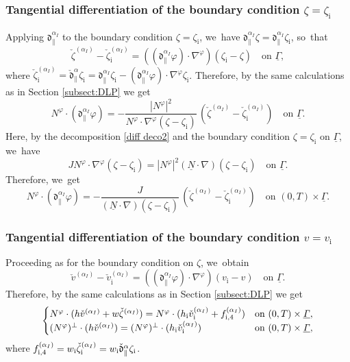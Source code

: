 \documentclass[JEP,XML,SOM,Unicode,NoFloatCountersInSection,published]{cedram}
\newcommand{\dpar}{{\mathfrak d}_{\parallel}}
\newcommand{\ul}[1]{\underline{#1}}
\newcommand{\itGamma}{\mathit{\Gamma}}
\newcommand{\cmfalpha}{\check{\mathfrak{d}}^{\alpha}}
\theoremstyle{definition}
\begin{document}
\subsubsection{Tangential differentiation of the boundary condition $\zeta=\zeta_\mathrm{i}$}
Applying $\dpar^{\alpha_I}$ to the boundary condition $\zeta=\zeta_\mathrm{i}$, we~have $\dpar^{\alpha_I}\zeta=\dpar^{\alpha_I}\zeta_\mathrm{i}$, so~that
\[
\check{\zeta}^{(\alpha_I)}-\check{\zeta}_\mathrm{i}^{(\alpha_I)} = ((\dpar^{\alpha_I}\varphi)\cdot\nabla^\varphi)(\zeta_\mathrm{i}-\zeta)
\quad\mbox{on } \ul{\itGamma},
\]
where $\check{\zeta}_\mathrm{i}^{(\alpha_I)} = \cmfalpha_\parallel \zeta_\mathrm{i}
= \dpar^{\alpha_I}\zeta_\mathrm{i}-(\dpar^{\alpha_I}\varphi)\cdot\nabla^\varphi\zeta_\mathrm{i}$.
Therefore, by the same calculations as in Section \ref{subsect:DLP} we get
\[
N^\varphi\cdot(\dpar^{\alpha_I}\varphi)
= -\frac{|N^\varphi|^2}{N^\varphi\cdot\nabla^\varphi(\zeta-\zeta_\mathrm{i})}\,(\check{\zeta}^{(\alpha_I)}-\check{\zeta}_\mathrm{i}^{(\alpha_I)})\quad\text{on }\ul{\itGamma}.
\]
Here, by the decomposition \eqref{diff deco2} and the boundary condition $\zeta=\zeta_\mathrm{i}$ on $\ul{\itGamma}$, we~have
\[
JN^\varphi\cdot\nabla^\varphi(\zeta-\zeta_\mathrm{i})=|N^\varphi|^2(\ul{N}\cdot\nabla)(\zeta-\zeta_\mathrm{i})\quad\text{on }\ul{\itGamma}.
\]
Therefore, we~get
\begin{equation}\label{EqPhi2}
N^\varphi\cdot(\dpar^{\alpha_I}\varphi)
= - \frac{J}{(\ul{N}\cdot\nabla)(\zeta-\zeta_\mathrm{i})}\,(\check{\zeta}^{(\alpha_I)}-\check{\zeta}_\mathrm{i}^{(\alpha_I)})
\quad\text{on } (0,T)\times\ul{\itGamma}.
\end{equation}

\subsubsection{Tangential differentiation of the boundary condition $v=v_\mathrm{i}$}
Proceeding as for the boundary condition on $\zeta$, we~obtain
\[
\check{v}^{(\alpha_I)}-\check{v}_\mathrm{i}^{(\alpha_I)} = ((\dpar^{\alpha_I}\varphi)\cdot\nabla^\varphi)(v_\mathrm{i}-v)
\quad\mbox{on } \ul{\itGamma}.
\]
Therefore, by the same calculations as in Section \ref{subsect:DLP} we get
\begin{equation}\label{QLBC0}
\begin{cases}
N^\varphi\cdot(h\check{v}^{(\alpha_I)}+w\check{\zeta}^{(\alpha_I)})
= N^\varphi\cdot(h_\mathrm{i}\check{v}_\mathrm{i}^{(\alpha_I)}+f_{{\rm i},4}^{(\alpha_I)}) &\text{on } (0,T)\times\ul{\itGamma}, \\
(N^\varphi)^\perp\cdot(h\check{v}^{(\alpha_I)})=(N^\varphi)^\perp\cdot(h_\mathrm{i}\check{v}_\mathrm{i}^{(\alpha_I)}) &\text{on } (0,T)\times\ul{\itGamma},
\end{cases}
\end{equation}
where $f_{{\rm i},4}^{(\alpha_I)}= w_\mathrm{i} \check{\zeta}_\mathrm{i}^{(\alpha_I)} = w_\mathrm{i} \cmfalpha_\parallel \zeta_\mathrm{i}$.
\end{document}
